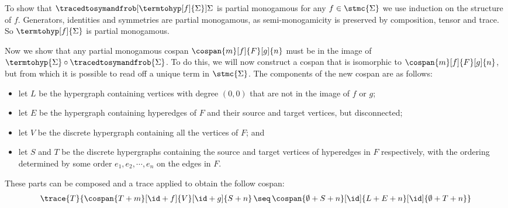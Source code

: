 To show that \(\tracedtosymandfrob[\termtohyp[f]{\Sigma}]{\Sigma}\) is partial
monogamous for any \(f \in \stmc{\Sigma}\) we use induction on the structure of
\(f\).
Generators, identities and symmetries are partial monogamous, as
semi-monogamicity is preserved by composition, tensor and trace.
So \(\termtohyp[f]{\Sigma}\) is partial monogamous.

Now we show that any partial monogamous cospan \(
    \cospan{m}[f]{F}[g]{n}
\)
must be in the image of \(
    \termtohyp{\Sigma} \circ \tracedtosymandfrob{\Sigma}
\).
To do this, we will now construct a cospan that is isomorphic to
\(\cospan{m}[f]{F}[g]{n}\), but from which it is possible to read off a
unique term in \(\stmc{\Sigma}\).
The components of the new cospan are as follows:
\begin{itemize}
    \item let \(L\) be the hypergraph containing vertices with degree
            \((0,0)\) that are not in the image of \(f\) or \(g\);
    \item let \(E\) be the hypergraph containing hyperedges of \(F\) and
            their source and target vertices, but disconnected;
    \item let \(V\) be the discrete hypergraph containing all the
            vertices of \(F\); and
    \item let \(S\) and \(T\) be the discrete hypergraphs containing
            the source and target vertices of hyperedges in \(F\)
            respectively, with the ordering determined by some order
            \(e_1,e_2,\cdots,e_n\) on the edges in \(F\).
\end{itemize}

These parts can be composed and a trace applied to obtain the follow
cospan:
\begin{gather}
    \trace{T}{
        \cospan{T + m}[\id + f]{V}[\id + g]{S + n}
        \,\seq\,
        \cospan{\emptyset + S + n}[\id]{L + E + n}[\id]{\emptyset + T + n}
    }
    \label{gat:cospan}
\end{gather}

